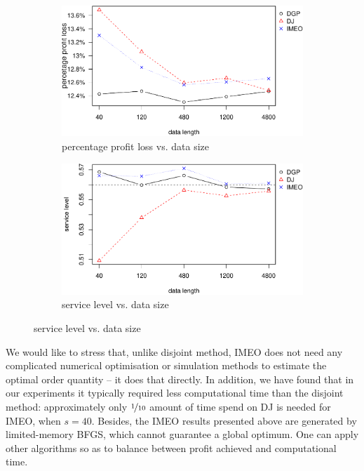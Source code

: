 \documentclass{article}
\begin{document}
\begin{figure}[ht]
\centering
\caption{Performance vs. sample size with nonlinear profit function}
\begin{subfigure}[b]{0.48\textwidth}
\centering
\includegraphics[width=\textwidth]{nonlinearppl.pdf}
\caption{percentage profit loss vs. data size}
\end{subfigure}
\hfill
\begin{subfigure}[b]{0.48\textwidth}
\centering
\includegraphics[width=\textwidth]{nonlinearsl.pdf}
\caption{service level vs. data size}
\end{subfigure}
\label{fig:non}
\end{figure}

We would like to stress that, unlike disjoint method, IMEO does not need any complicated numerical optimisation or simulation methods to estimate the optimal order quantity -- it does that directly. In addition, we have found that in our experiments it typically required less computational time than the disjoint method: approximately only $\nicefrac{1}{10}$ amount of time spend on DJ is needed for IMEO, when $s=40$. Besides, the IMEO results presented above are generated by limited-memory BFGS, which cannot guarantee a global optimum. One can apply other algorithms so as to balance between profit achieved and computational time.
\end{document}

